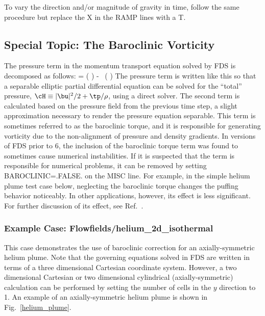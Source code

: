 \documentclass[11pt]{book}
\begin{document}
To vary the direction and/or magnitude of gravity in time, follow the same procedure but replace the {\ct X} in the {\ct RAMP}
lines with a {\ct T}.



\subsection{Special Topic: The Baroclinic Vorticity}
\label{baroclinic_torque}

The pressure term in the momentum transport equation solved by FDS is decomposed as follows:
\be {} \nabla \tp = \nabla \left( \frac{\tp}{\rho}\right) - \tp \, \nabla \left( \right)  \ee
The pressure term is written like this so that a separable elliptic partial differential equation can be solved for the
``total'' pressure, $\cH \equiv |\bu|^2/2 + \tp/\rho$, using a direct solver. The second term is calculated based on
the pressure field from the previous time step, a slight approximation necessary to render the pressure equation separable.
This term is sometimes referred to as the baroclinic torque, and it is responsible for
generating vorticity due to the non-alignment of pressure and density gradients.
In versions of FDS prior to 6, the inclusion of the baroclinic torque term was found to sometimes cause numerical
instabilities. If it is suspected that the term is responsible for numerical problems, it can be removed by setting {\ct BAROCLINIC=.FALSE.} on the {\ct MISC} line.
For example, in the simple helium plume test case below,
neglecting the baroclinic torque changes the puffing behavior noticeably. In other applications, however, its effect is less significant.
For further discussion of its effect, see Ref.~\cite{Xin:JSS2005}.



\subsubsection{Example Case: Flowfields/helium\_2d\_isothermal}

This case demonstrates the use of baroclinic correction for an axially-symmetric helium plume.
Note that the governing equations solved in FDS are written in terms of a
three dimensional Cartesian coordinate system. However,
a two dimensional Cartesian or two dimensional cylindrical
(axially-symmetric) calculation can be performed by setting the number of
cells in the $y$ direction to 1.
An example of an axially-symmetric helium plume is shown in Fig.~\ref{helium_plume}.
\end{document}
